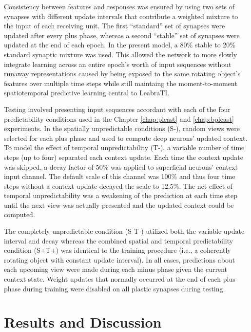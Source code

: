 \documentclass[dwyatte_dissertation.tex]{subfiles}
\begin{document}
Consistency between features and responses was ensured by using two sets of synapses with different update intervals that contribute a weighted mixture to the input of each receiving unit. The first ``standard'' set of synapses were updated after every plus phase, whereas a second ``stable'' set of synapses were updated at the end of each epoch. In the present model, a 80\% stable to 20\% standard synaptic mixture was used. This allowed the network to more slowly integrate learning across an entire epoch's worth of input sequences without runaway representations caused by being exposed to the same rotating object's features over multiple time steps while still maintaing the moment-to-moment spatiotemporal predictive learning central to LeabraTI.

Testing involved presenting input sequences accordant with each of the four predictability conditions used in the Chapter \ref{chap:pleast} and \ref{chap:bpleast} experiments. In the spatially unpredictable conditions (S-), random views were selected for each plus phase and used to compute deep neurons' updated context. To model the effect of temporal unpredictability (T-), a variable number of time steps (up to four) separated each context update. Each time the context update was skipped, a decay factor of 50\% was applied to superficial neurons' context input channel. The default scale of this channel was 100\% and thus four time steps without a context update decayed the scale to 12.5\%. The net effect of temporal unpredictability was a weakening of the prediction at each time step until the next view was actually presented and the updated context could be computed.

The completely unpredictable condition (S-T-) utilized both the variable update interval and decay whereas the combined spatial and temporal predictability condition (S+T+) was identical to the training procedure (i.e., a coherently rotating object with constant update interval). In all cases, predictions about each upcoming view were made during each minus phase given the current context state. Weight updates that normally occurred at the end of each plus phase during training were disabled on all plastic synapses during testing.

\section{Results and Discussion}
\end{document}
